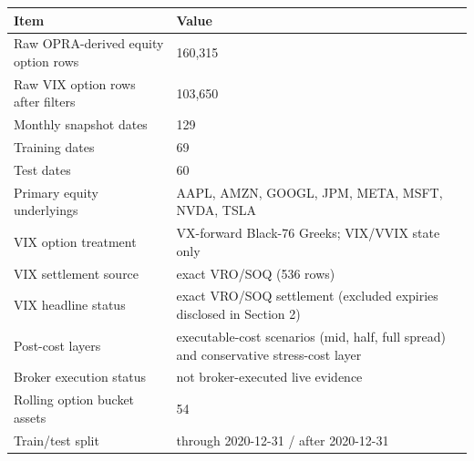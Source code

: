 \begin{tabular}{ll}
\toprule
Item & Value \\
\midrule
Raw OPRA-derived equity option rows & 160,315 \\
Raw VIX option rows after filters & 103,650 \\
Monthly snapshot dates & 129 \\
Training dates & 69 \\
Test dates & 60 \\
Primary equity underlyings & AAPL, AMZN, GOOGL, JPM, META, MSFT, NVDA, TSLA \\
VIX option treatment & VX-forward Black-76 Greeks; VIX/VVIX state only \\
VIX settlement source & exact VRO/SOQ (536 rows) \\
VIX headline status & exact VRO/SOQ settlement (excluded expiries disclosed in Section 2) \\
Post-cost layers & executable-cost scenarios (mid, half, full spread) and conservative stress-cost layer \\
Broker execution status & not broker-executed live evidence \\
Rolling option bucket assets & 54 \\
Train/test split & through 2020-12-31 / after 2020-12-31 \\
\bottomrule
\end{tabular}
